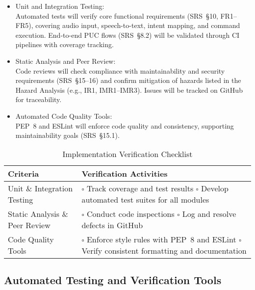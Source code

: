 \documentclass[12pt, titlepage]{article}
\begin{document}
\begin{itemize}
    \item Unit and Integration Testing: \\
    Automated tests will verify core functional requirements (SRS~§10, FR1--FR5), covering audio input, speech-to-text, intent mapping, and command execution. End-to-end PUC flows (SRS~§8.2) will be validated through CI pipelines with coverage tracking.

    \item Static Analysis and Peer Review: \\
    Code reviews will check compliance with maintainability and security requirements (SRS~§15--16) and confirm mitigation of hazards listed in the Hazard Analysis (e.g., IR1, IMR1--IMR3). Issues will be tracked on GitHub for traceability.

    \item Automated Code Quality Tools: \\
    PEP~8 and ESLint will enforce code quality and consistency, supporting maintainability goals (SRS~§15.1).
\end{itemize}

\begin{table}[H]
\centering
\caption{Implementation Verification Checklist}
\renewcommand{\arraystretch}{1.3}
\begin{tabular}{|p{6cm}|p{8cm}|}
\hline
Criteria & Verification Activities \\ \hline
Unit \& Integration Testing &
\(\square\) Track coverage and test results \newline
\(\square\) Develop automated test suites for all modules \\ \hline
Static Analysis \& Peer Review &
\(\square\) Conduct code inspections \newline
\(\square\) Log and resolve defects in GitHub \\ \hline
Code Quality Tools &
\(\square\) Enforce style rules with PEP~8 and ESLint \newline
\(\square\) Verify consistent formatting and documentation \\ \hline
\end{tabular}
\end{table}


\subsection{Automated Testing and Verification Tools}
\end{document}

